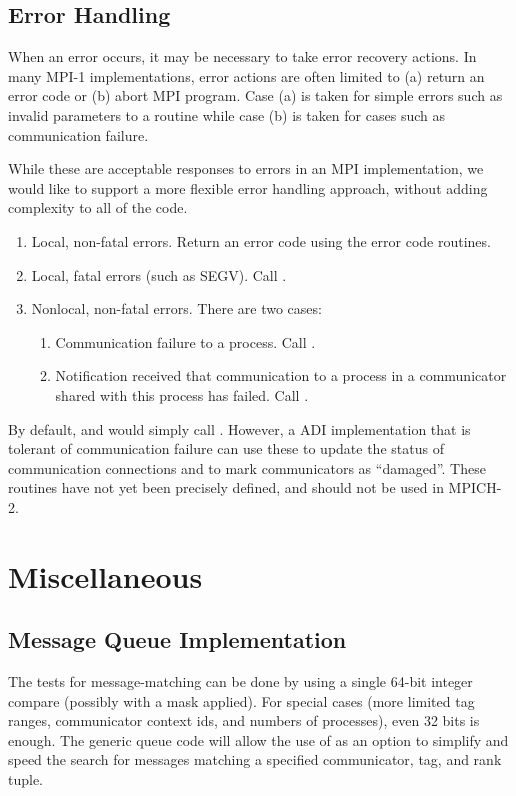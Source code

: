 \documentclass[dvipdfm]{article}
\begin{document}
\subsection{Error Handling}
\label{sec:error-handling}

When an error occurs, it may be necessary to take error recovery
actions.  In many MPI-1 implementations, error actions are often
limited to (a) return an error code or (b) abort MPI program.
Case (a) is taken for simple errors such as invalid parameters to a
routine while case (b) is taken for cases such as communication
failure.  

While these are acceptable responses to errors in an MPI
implementation, we would like to support a more flexible error
handling approach, without adding complexity to all of the code.
\begin{enumerate}
\item Local, non-fatal errors.  Return an error code using the error
code routines.
\item Local, fatal errors (such as SEGV).  Call .
\item Nonlocal, non-fatal errors.  There are two cases:
   \begin{enumerate}
   \item Communication failure to a process.  Call
       .
   \item Notification received that communication to a process in a 
       communicator shared with this process has failed.  Call 
       .
   \end{enumerate}
\end{enumerate}
By default,  and  would simply
call .  However, a ADI implementation that is
tolerant of communication failure can use these to update the status
of communication connections and to mark communicators as
``damaged''.  These routines have not yet been precisely defined, and
should not be used in MPICH-2.

%

\section{Miscellaneous}
\label{sec:misc}

\subsection{Message Queue Implementation}
The tests for message-matching can be done by using a single 64-bit
integer compare (possibly with a mask applied).  For special cases
(more limited tag ranges, communicator context ids, and numbers of
processes), even 32 bits is enough.  The generic queue code will allow
the use of  as an option to simplify and speed the
search for messages matching a specified communicator, tag, and rank
tuple.
\end{document}
